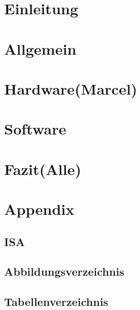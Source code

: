 \cleardoublepage
\tableofcontents

\cleardoublepage
\chapter{Einleitung}


\cleardoublepage
\chapter{Allgemein}


\cleardoublepage
\chapter{Hardware(Marcel)}


\cleardoublepage
\chapter{Software}


\chapter{Fazit(Alle)}


\chapter{Appendix}

\section{ISA}



\section{Abbildungsverzeichnis}
\listoffigures 

\section{Tabellenverzeichnis}
\listoftables


